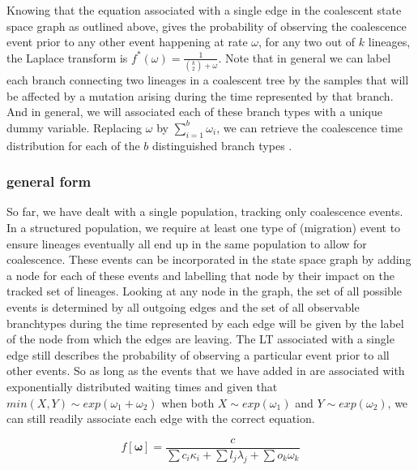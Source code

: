 \documentclass[10pt, a4]{article}
\begin{document}
Knowing that the equation associated with a single edge in the coalescent state space graph as outlined above, gives the probability of observing the coalescence event prior to any other event happening at rate $\omega$, for any two out of $k$ lineages, the Laplace transform is $f^{*}(\omega) = \frac{1}{{k\choose{2}} + \omega}$. Note that in general we can label each branch connecting two lineages in a coalescent tree by the samples that will be affected by a mutation arising during the time represented by that branch. And in general, we will associated each of these branch types with a unique dummy variable. Replacing $\omega$ by $\sum_{i=1}^{b} \omega_i$, we can retrieve the coalescence time distribution for each of the $b$ distinguished branch types \citep{Lohse2011}. 

\subsubsection{general form}
So far, we have dealt with a single population, tracking only coalescence events. In a structured population, we require at least one type of (migration) event to ensure lineages eventually all end up in the same population to allow for coalescence. These events can be incorporated in the state space graph by adding a node for each of these events and labelling that node by their impact on the tracked set of lineages. Looking at any node in the graph, the set of all possible events is determined by all outgoing edges and the set of all observable branchtypes during the time represented by each edge will be given by the label of the node from which the edges are leaving. The LT associated with a single edge still describes the probability of observing a particular event prior to all other events. So as long as the events that we have added in are associated with exponentially distributed waiting times and given that $min(X, Y) \sim exp(\omega_1+\omega_2)$ when both $X \sim exp(\omega_1)$ and $Y \sim exp(\omega_2)$, we can still readily associate each edge with the correct equation.

\begin{equation} \label{eq:general_form}
f[\boldsymbol{\omega}] = \frac{c}{\sum c_i\kappa_i + \sum l_j\lambda_j + \sum o_k \omega_k} 
\end{equation}
\end{document}
